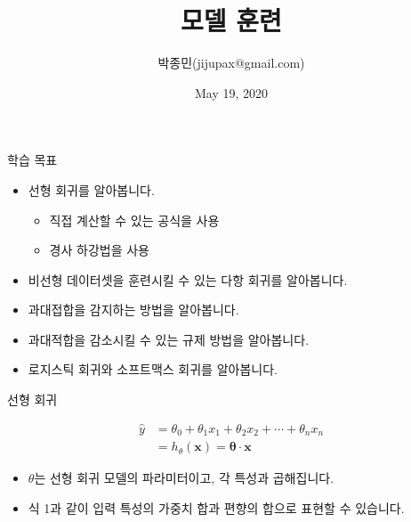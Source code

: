 \documentclass{beamer}
\title{모델 훈련}
\author{박종민(jijupax@gmail.com)}
\date{May 19, 2020}
\numberwithin{equation}{section}
\begin{document}
\begin{frame}
    \titlepage
\end{frame}



\begin{frame}{학습 목표}

\begin{itemize}
\item 선형 회귀를 알아봅니다.
    \begin{itemize}
    \item 직접 계산할 수 있는 공식을 사용
    \item 경사 하강법을 사용
\end{itemize}
\vskip 0.25cm
\item 비선형 데이터셋을 훈련시킬 수 있는 다항 회귀를 알아봅니다.
\vskip 0.25cm
\item 과대접합을 감지하는 방법을 알아봅니다.
\vskip 0.25cm
\item 과대적합을 감소시킬 수 있는 규제 방법을 알아봅니다.
\vskip 0.25cm
\item 로지스틱 회귀와 소프트맥스 회귀를 알아봅니다.
\end{itemize}

\end{frame}


\begin{frame}{선형 회귀}

\begin{equation}
\begin{split}
\hat{y} &= \theta_{0} + \theta_{1}x_{1} + \theta_{2}x_{2} + \cdots + \theta_{n}x_{n} \\
        &= h_{\theta}(\mathbf{x}) = \mathbf{\theta} \cdot \mathbf{x}
\end{split}
\end{equation}

\vskip 1cm

\begin{itemize}
\item $\theta$는 선형 회귀 모델의 파라미터이고, 각 특성과 곱해집니다.
\vskip 0.25cm
\item 식 1과 같이 입력 특성의 가중치 합과 편향의 합으로 표현할 수 있습니다.
\end{itemize}

\end{frame}
\end{document}
